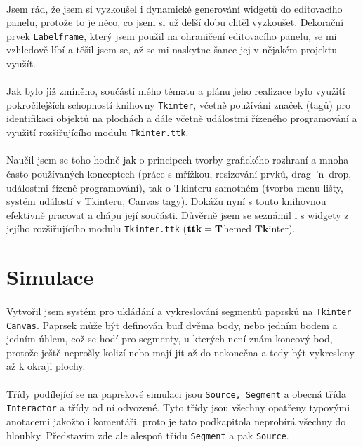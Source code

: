 \documentclass[12pt,a4paper]{report}
\begin{document}
\paragraph{} Jsem rád, že jsem si vyzkoušel i dynamické generování widgetů do editovacího panelu, protože to je něco, co jsem si už delší dobu chtěl vyzkoušet. Dekorační prvek \lstinline{Labelframe}, který jsem použil na ohraničení editovacího panelu, se mi vzhledově líbí a těšil jsem se, až se mi naskytne šance jej v nějakém projektu využít.
\paragraph{} Jak bylo již zmíněno, součástí mého tématu a plánu jeho realizace bylo využití pokročilejších schopností knihovny \lstinline{Tkinter}, včetně používání značek (tagů) pro identifikaci objektů na plochách a dále včetně událostmi řízeného programování a využití rozšiřujícího modulu \lstinline{Tkinter.ttk}.
\paragraph{} Naučil jsem se toho hodně jak o principech tvorby grafického rozhraní a mnoha často používaných konceptech (práce s mřížkou, resizování prvků, drag 'n drop, událostmi řízené programování), tak o Tkinteru samotném (tvorba menu lišty, systém událostí v Tkinteru, Canvas tagy). Dokážu nyní s touto knihovnou efektivně pracovat a chápu její součásti. Důvěrně jsem se seznámil i s widgety z jejího rozšiřujícího modulu \lstinline{Tkinter.ttk} ($\mathbf{ttk} = \bold{T}$hemed $\mathbf{Tk}$inter).
\section{Simulace}
\paragraph{} Vytvořil jsem systém pro ukládání a vykreslování segmentů paprsků na \lstinline{Tkinter Canvas}. Paprsek může být definován buď dvěma body, nebo jedním bodem a jedním úhlem, což se hodí pro segmenty, u kterých není znám koncový bod, protože ještě neprošly kolizí nebo mají jít až do nekonečna a tedy být vykresleny až k okraji plochy.
\paragraph{} Třídy podílející se na paprskové simulaci jsou \lstinline{Source, Segment} a obecná třída \lstinline{Interactor} a třídy od ní odvozené. Tyto třídy jsou všechny opatřeny typovými anotacemi jakožto i komentáři, proto je tato podkapitola neprobírá všechny do hloubky. Představím zde ale alespoň třídu \lstinline{Segment} a pak \lstinline{Source}.
\end{document}
